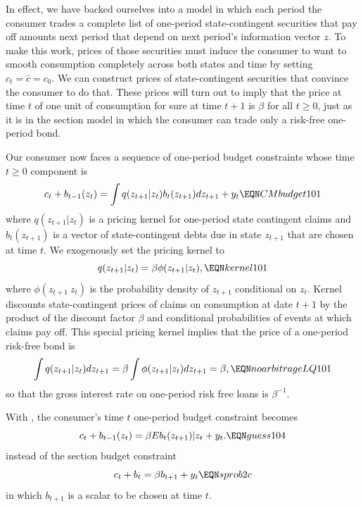 
In effect,  we have backed ourselves into  a model in which each period the consumer  trades a complete
list of one-period state-contingent securities that  pay off amounts next period that depend on next period's information vector $z$. 
  To make this work,  prices of those securities must induce the consumer to want to smooth consumption completely
across both states and time by setting $c_t = \bar c = c_0$.  
We can construct   prices of state-contingent securities that convince the consumer to do that.
These prices will turn out to  imply that the price at time $t$ of one unit of consumption for sure at time $t+1$ is $\beta$ for all $t \geq 0$, just as it is in the section   model  in which
the consumer can trade only a risk-free one-period bond.

  
Our consumer now faces a sequence of one-period budget constraints whose time $t \geq 0$ component is
$$ c_t + b_{t-1}(z_t) = \int  q(z_{t+1} | z_t ) b_t(z_{t+1}) d z_{t+1} + y_t  \EQN CMbudget101 $$
where $q(z_{t+1} | z_t)$ is a pricing kernel for one-period  state contingent claims and $b_t(z_{t+1})$ is   a vector of state-contingent debts due in state $z_{t+1}$
 that are chosen at time $t$.
We exogenously set the pricing kernel to 
$$ q(z_{t+1} | z_t ) = \beta \phi(z_{t+1} | z_t) , \EQN kernel101 $$
where $\phi(z_{t+1} \ z_t)$ is the probability density of $z_{t+1}$ conditional on $z_t$.  Kernel  discounts state-contingent prices
of claims on consumption at date $t+1$ by the product of the discount factor $\beta$ and  conditional probabilities of   events
at which  claims pay off. This special   pricing kernel
implies that the price of a one-period risk-free bond is 
$$ \int q(z_{t+1} | z_t) d z_{t+1} = \beta \int \phi(z_{t+1} | z_t) d z_{t+1} = \beta,  \EQN noarbitrageLQ101 $$
so that the gross interest rate on one-period risk free loans is  $\beta^{-1}$.

With   , the  
consumer's time $t$ one-period budget constraint   becomes
$$ c_t + b_{t-1}(z_t) = \beta E b_t(z_{t+1}) | z_t  + y_t  .\EQN guess104 $$
instead of the section  
  budget constraint 
$$ c_t + b_t = \beta b_{t+1}  + y_t \EQN sprob2c $$
in which  $b_{t+1}$ is a scalar to be chosen at time $t$. 



